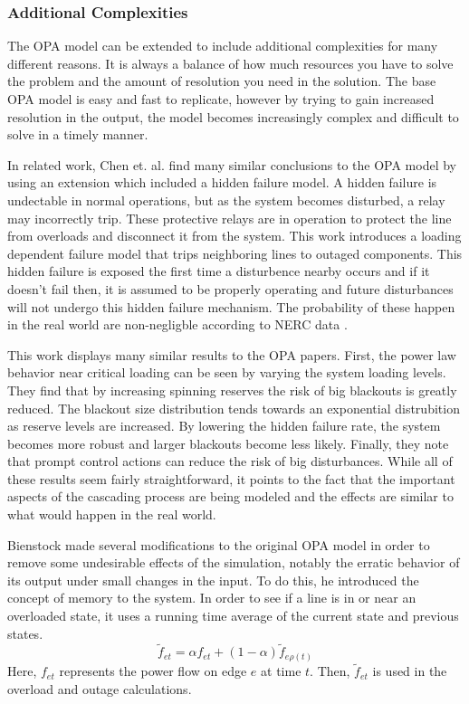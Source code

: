 \subsubsection{Additional Complexities}

The OPA model can be extended to include additional complexities for many different reasons.  It is always a balance of how much resources you have to solve the problem and the amount of resolution you need in the solution.  The base OPA model is easy and fast to replicate, however by trying to gain increased resolution in the output, the model becomes increasingly complex and difficult to solve in a timely manner.

In related work, Chen et. al. \cite{chen_2005} find many similar conclusions to the OPA model by using an extension which included a hidden failure model.  A hidden failure is undectable in normal operations, but as the system becomes disturbed, a relay may incorrectly trip.  These protective relays are in operation to protect the line from overloads and disconnect it from the system.  This work introduces a loading dependent failure model that trips neighboring lines to outaged components.  This hidden failure is exposed the first time a disturbence nearby occurs and if it doesn't fail then, it is assumed to be properly operating and future disturbances will not undergo this hidden failure mechanism.  The probability of these happen in the real world are non-negligble according to NERC data \cite{nerc_dawg}.  

This work displays many similar results to the OPA papers.  First, the power law behavior near critical loading can be seen by varying the system loading levels.  They find that by increasing spinning reserves the risk of big blackouts is greatly reduced.  The blackout size distribution tends towards an exponential distrubition as reserve levels are increased.  By lowering the hidden failure rate, the system becomes more robust and larger blackouts become less likely.  Finally, they note that prompt control actions can reduce the risk of big disturbances.  While all of these results seem fairly straightforward, it points to the fact that the important aspects of the cascading process are being modeled and the effects are similar to what would happen in the real world.

Bienstock made several modifications \cite{bienstock_2011} to the original OPA model in order to remove some undesirable effects of the simulation, notably the erratic behavior of its output under small changes in the input.  To do this, he introduced the concept of memory to the system.  In order to see if a line is in or near an overloaded state, it uses a running time average of the current state and previous states.
\begin{equation}
\tilde{f}_{et} = \alpha f_{et} + (1-\alpha) \tilde{f}_{e\rho(t)}
\end{equation} 
Here, $f_{et}$ represents the power flow on edge $e$ at time $t$.  Then, $\tilde{f}_{et}$ is used in the overload and outage calculations.

